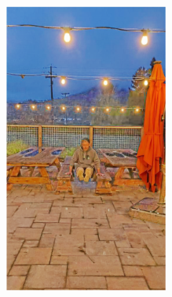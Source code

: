 \documentclass[letterpaper,12pt]{article}
\begin{document}
\begin{figure}[htbp]
\begin{subfigure}{0.128\textwidth}
			\includegraphics[width=\linewidth]{LoLi-Phone-imgT_1/KinD++}
			\captionsetup{font=scriptsize}
			\caption{}
			\label{fig: LoLi-Phone-imgT_1_g}
		\end{subfigure}\\
		\begin{subfigure}{0.128\textwidth}

\end{subfigure}
\end{figure}
\end{document}

